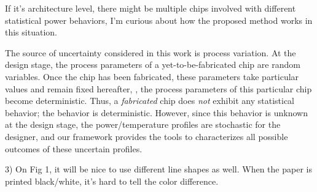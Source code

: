 \begin{reviewer}
[\ldots] If it’s architecture level, there might be multiple chips involved with different statistical power behaviors, I’m curious about how the proposed method works in this situation.
\end{reviewer}
\begin{authors}
The source of uncertainty considered in this work is process variation.
At the design stage, the process parameters of a yet-to-be-fabricated chip are random variables.
Once the chip has been fabricated, these parameters take particular values and remain fixed hereafter, \ie, the process parameters of this particular chip become deterministic.
Thus, a \emph{fabricated} chip does \emph{not} exhibit any statistical behavior; the behavior is deterministic.
However, since this behavior is unknown at the design stage, the power/temperature profiles are stochastic for the designer, and our framework provides the tools to characterizes all possible outcomes of these uncertain profiles.

\end{authors}

\begin{reviewer}
3) On Fig 1, it will be nice to use different line shapes as well. When the paper is printed black/white, it’s hard to tell the color difference.
\end{reviewer}
\begin{authors}


\end{authors}
